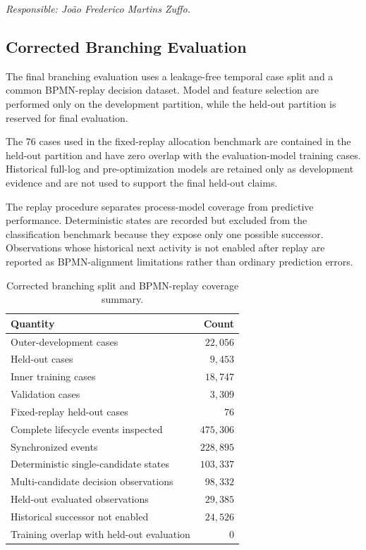 \noindent\textit{Responsible: João Frederico Martins Zuffo.}


\subsection{Corrected Branching Evaluation}
\label{app:joao_branching_model_selection}

The final branching evaluation uses a leakage-free temporal case split and a
common BPMN-replay decision dataset. Model and feature selection are performed
only on the development partition, while the held-out partition is reserved
for final evaluation.

The $76$ cases used in the fixed-replay allocation benchmark are contained in
the held-out partition and have zero overlap with the evaluation-model training
cases. Historical full-log and pre-optimization models are retained only as
development evidence and are not used to support the final held-out claims.

The replay procedure separates process-model coverage from predictive
performance. Deterministic states are recorded but excluded from the
classification benchmark because they expose only one possible successor.
Observations whose historical next activity is not enabled after replay are
reported as BPMN-alignment limitations rather than ordinary prediction errors.

\begin{table}[H]
    \caption{Corrected branching split and BPMN-replay coverage summary.}
    \label{tab:appendix_branching_split_joao}
    \centering
    \renewcommand{\arraystretch}{1.1}
    \small
    \begin{tabular}{lr}
        \toprule
        \textbf{Quantity} & \textbf{Count} \\
        \midrule
        Outer-development cases
        & $22{,}056$ \\
        Held-out cases
        & $9{,}453$ \\
        Inner training cases
        & $18{,}747$ \\
        Validation cases
        & $3{,}309$ \\
        Fixed-replay held-out cases
        & $76$ \\
        Complete lifecycle events inspected
        & $475{,}306$ \\
        Synchronized events
        & $228{,}895$ \\
        Deterministic single-candidate states
        & $103{,}337$ \\
        Multi-candidate decision observations
        & $98{,}332$ \\
        Held-out evaluated observations
        & $29{,}385$ \\
        Historical successor not enabled
        & $24{,}526$ \\
        Training overlap with held-out evaluation
        & $0$ \\
        \bottomrule
    \end{tabular}
\end{table}

